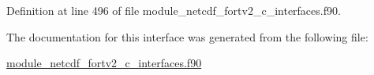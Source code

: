 Definition at line 496 of file module\+\_\+netcdf\+\_\+fortv2\+\_\+c\+\_\+interfaces.\+f90.



The documentation for this interface was generated from the following file\+:\begin{DoxyCompactItemize}
\item 
\hyperlink{module__netcdf__fortv2__c__interfaces_8f90}{module\+\_\+netcdf\+\_\+fortv2\+\_\+c\+\_\+interfaces.\+f90}\end{DoxyCompactItemize}
